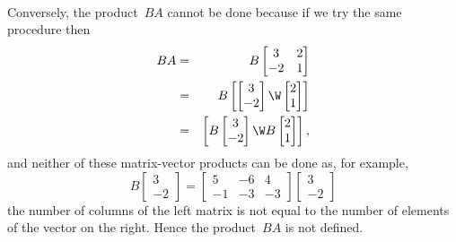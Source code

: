 \begin{example}
\begin{eqnarray*}
\end{eqnarray*}
Conversely, the product~\(BA\) cannot be done because if we try the same procedure then
\begin{eqnarray*}
BA&=&B\begin{bmatrix} 3 & 2\\ -2 & 1 \end{bmatrix}
\\&=&B\begin{bmatrix} \begin{bmatrix} 3 \\ -2 \end{bmatrix}\W 
\begin{bmatrix} 2 \\ 1 \end{bmatrix} \end{bmatrix}
\\&=&\begin{bmatrix} B\begin{bmatrix} 3 \\ -2 \end{bmatrix}\W 
B\begin{bmatrix} 2 \\ 1 \end{bmatrix} \end{bmatrix},
\end{eqnarray*}
and neither of these matrix-vector products can be done as, for example,
\begin{equation*}
B\begin{bmatrix} 3 \\ -2 \end{bmatrix}
=\begin{bmatrix} 5 & -6 & 4\\ -1 & -3 & -3 \end{bmatrix}
\begin{bmatrix} 3 \\ -2 \end{bmatrix}
\end{equation*}
the number of columns of the left matrix is not equal to the number of elements of the vector on the right.
Hence the product~\(BA\) is not defined.
\end{example}




